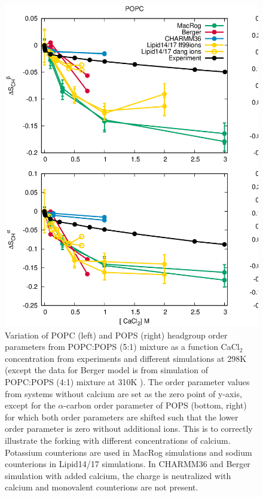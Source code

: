 \documentclass[aps,prl,superscriptaddress,twocolumn]{revtex4}
\begin{document}
\begin{figure}[ht]
  \centering
  \includegraphics[width=18cm]{../Figs/CHANGESwithCaClPS.eps}
  \caption{\label{changesWITHCaClPS}
   Variation of POPC (left) and POPS (right) headgroup order parameters from POPC:POPS (5:1) mixture
    as a function CaCl$_2$ concentration from experiments \cite{roux90} and different simulations
    at 298K (except the data for Berger model is from simulation of POPC:POPS (4:1) mixture at 310K \cite{ollila07a,melcrova16}). 
    The order parameter values from systems without calcium are set as the zero point of y-axis,
    except for the $\alpha$-carbon order parameter of POPS (bottom, right) for which both order parameters are shifted
    such that the lower order parameter is zero without additional ions. This is to correctly illustrate
    the forking with different concentrations of calcium.
    Potassium counterions are used in MacRog simulations and sodium counterions in Lipid14/17 simulations.
    In CHARMM36 and Berger simulation with added calcium, the charge is neutralized with calcium and monovalent counterions are not present.
  }
\end{figure}
\end{document}
